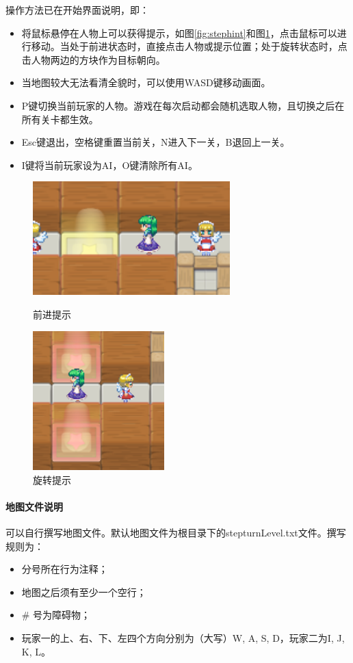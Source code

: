 操作方法已在开始界面说明，即：
\begin{itemize}
	\item 将鼠标悬停在人物上可以获得提示，如图\ref{fig:stephint}和图\ref{fig:turnhint}，点击鼠标可以进行移动。当处于前进状态时，直接点击人物或提示位置；处于旋转状态时，点击人物两边的方块作为目标朝向。
	\item 当地图较大无法看清全貌时，可以使用{\ttfamily WASD}键移动画面。
	\item {\ttfamily P}键切换当前玩家的人物。游戏在每次启动都会随机选取人物，且切换之后在所有关卡都生效。
	\item {\ttfamily Esc}键退出，空格键重置当前关，{\ttfamily N}进入下一关，{\ttfamily B}退回上一关。
	\item {\ttfamily I}键将当前玩家设为AI，{\ttfamily O}键清除所有AI。
\end{itemize}

\begin{figure}[htbp]
\begin{minipage}[t]{0.5\linewidth}
\centering
\includegraphics[width=3in]{pic/stephint.png}
\caption{前进提示}
\label{fig:stephint}
\end{minipage}
\begin{minipage}[t]{0.5\linewidth}
\centering
\includegraphics[width=2in]{pic/turnhint.png}
\caption{旋转提示}
\label{fig:turnhint}
\end{minipage}
\end{figure}

\paragraph{地图文件说明}
可以自行撰写地图文件。默认地图文件为根目录下的{\ttfamily stepturnLevel.txt}文件。撰写规则为：
\begin{itemize}
	\item 分号所在行为注释；
	\item 地图之后须有至少一个空行；
	\item \# 号为障碍物；
	\item 玩家一的上、右、下、左四个方向分别为（大写）{\ttfamily W, A, S, D}，玩家二为{\ttfamily I, J, K, L}。
\end{itemize}

